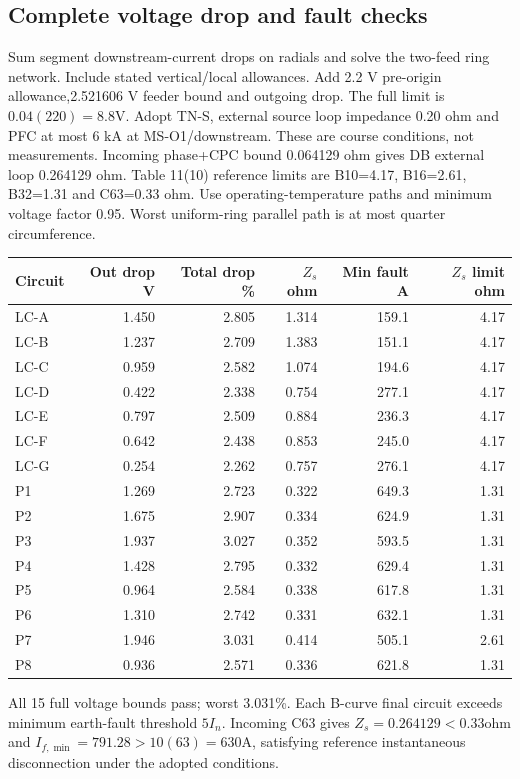 \documentclass[11pt,a4paper]{article}
\begin{document}
\subsection*{Complete voltage drop and fault checks}
Sum segment downstream-current drops on radials and solve the two-feed ring network. Include stated vertical/local allowances. Add 2.2 V pre-origin allowance,2.521606 V feeder bound and outgoing drop. The full limit is $0.04(220)=8.8$V.
Adopt TN-S, external source loop impedance 0.20 ohm and PFC at most 6 kA at MS-O1/downstream. These are course conditions, not measurements. Incoming phase+CPC bound 0.064129 ohm gives DB external loop 0.264129 ohm. Table 11(10) reference limits are B10=4.17, B16=2.61, B32=1.31 and C63=0.33 ohm. Use operating-temperature paths and minimum voltage factor 0.95. Worst uniform-ring parallel path is at most quarter circumference.
\begin{longtable}{lrrrrr}\toprule
Circuit & Out drop V & Total drop \% & $Z_s$ ohm & Min fault A & $Z_s$ limit ohm\\\midrule\endhead

LC-A & 1.450 & 2.805 & 1.314 & 159.1 & 4.17 \\
LC-B & 1.237 & 2.709 & 1.383 & 151.1 & 4.17 \\
LC-C & 0.959 & 2.582 & 1.074 & 194.6 & 4.17 \\
LC-D & 0.422 & 2.338 & 0.754 & 277.1 & 4.17 \\
LC-E & 0.797 & 2.509 & 0.884 & 236.3 & 4.17 \\
LC-F & 0.642 & 2.438 & 0.853 & 245.0 & 4.17 \\
LC-G & 0.254 & 2.262 & 0.757 & 276.1 & 4.17 \\
P1 & 1.269 & 2.723 & 0.322 & 649.3 & 1.31 \\
P2 & 1.675 & 2.907 & 0.334 & 624.9 & 1.31 \\
P3 & 1.937 & 3.027 & 0.352 & 593.5 & 1.31 \\
P4 & 1.428 & 2.795 & 0.332 & 629.4 & 1.31 \\
P5 & 0.964 & 2.584 & 0.338 & 617.8 & 1.31 \\
P6 & 1.310 & 2.742 & 0.331 & 632.1 & 1.31 \\
P7 & 1.946 & 3.031 & 0.414 & 505.1 & 2.61 \\
P8 & 0.936 & 2.571 & 0.336 & 621.8 & 1.31 \\

\bottomrule\end{longtable}
All 15 full voltage bounds pass;  worst 3.031\%. Each B-curve final circuit exceeds minimum earth-fault threshold $5I_n$. Incoming C63 gives $Z_s=0.264129<0.33$ohm and $I_{f,\min}=791.28>10(63)=630$A, satisfying reference instantaneous disconnection under the adopted conditions.
\end{document}
